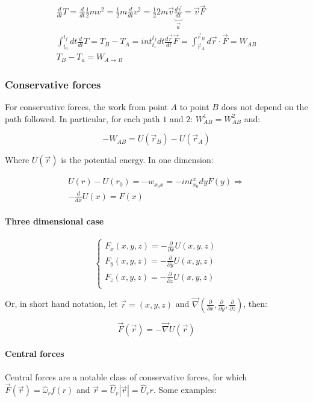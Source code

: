   \begin{align*}
    \frac{d{}}{d{t}}T = \frac{d{}}{d{t}}\frac{1}{2}mv^2 = \frac{1}{2}m \frac{d{}}{d{t}}v^2 = \frac{1}{2}2m \vec{v}\underbrace{\frac{d{\vec{v}}}{d{t}}}_{\vec{a}} = \vec{v} \vec{F}\\
    \int_{t_0}^{t_f}dt \frac{d{}}{d{t}}T = T_B-T_A = int_{t_i}^{t_f}dt \frac{d{\vec{r}}}{d{t}}\vec{F} = \int_{\vec{r}_A}^{\vec{r}_B} d \vec{r}\cdot \vec{F} = W_{AB}\\
    T_B-T_a = W_{A\rightarrow B}
  \end{align*}

    \subsubsection{Conservative forces}
    For conservative forces, the work from point $A$ to point $B$ does not depend on the path followed. In particular, for each path $1$ and $2$: $W_{AB}^1 = W_{AB}^2$ and:

    $$-W_{AB} = U(\vec{r}_B) - U(\vec{r}_A)$$

    Where $U(\vec{r})$ is the potential energy.
    In one dimension:

    \begin{align*}
      U(r) -U(r_0) = -w_{x_0x} = -int_{x_0}^xdyF(y) \Rightarrow\\
      -\frac{d{}}{d{x}}U(x) = F(x)
    \end{align*}

      \paragraph{Three dimensional case}
  
      $$\begin{cases}
        F_x(x,y,z) = - \frac{\partial {}}{\partial {x}}U(x,y,z)\\
        F_y(x,y,z) = - \frac{\partial {}}{\partial {y}}U(x,y,z)\\
        F_z(x,y,z) = - \frac{\partial {}}{\partial {z}}U(x,y,z)\\
      \end{cases}$$
  
      Or, in short hand notation, let $\vec{r}=(x,y,z)$ and $\vec{\nabla}(\frac{\partial {}}{\partial {x}},\frac{\partial {}}{\partial {y}},\frac{\partial {}}{\partial {z}})$, then:
  
      $$\vec{F}(\vec{r}) = -\vec{\nabla}U(\vec{r})$$
  
      \paragraph{Central forces}
      Central forces are a notable class of conservative forces, for which $\vec{F}(\vec{r}) = \hat{\omega}_{r}f(r)$ and $\vec{r} = \hat{U}_{r}|\vec{r}| = \hat{U}_{r}r$.
      Some examples:

